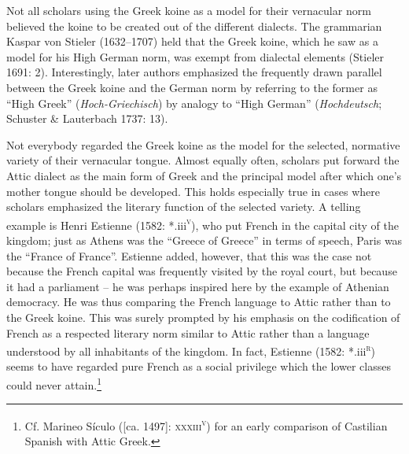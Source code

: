 \documentclass[12pt]{article}
\newenvironment{styleStandard}{\renewcommand\baselinestretch{1.25}\setlength\leftskip{0in}\setlength\rightskip{0in}\setlength\parindent{0.1972in}\setlength\parfillskip{0pt plus 1fil}\setlength\parskip{0in plus 1pt}\writerlistparindent\writerlistleftskip\leavevmode\normalfont\normalsize\writerlistlabel\ignorespaces}{\unskip\vspace{0in plus 1pt}\par}
\newcommand\writerlistleftskip{}
\newcommand\writerlistparindent{}
\newcommand\writerlistlabel{}
\begin{document}
\begin{styleStandard}
Not all scholars using the Greek koine as a model for their vernacular norm believed the koine to be created out of the different dialects. The grammarian Kaspar von Stieler (1632–1707) held that the Greek koine, which he saw as a model for his High German norm, was exempt from dialectal elements (Stieler 1691: 2). Interestingly, later authors emphasized the frequently drawn parallel between the Greek koine and the German norm by referring to the former as “High Greek” (\textit{Hoch-Griechisch}) by analogy to “High German” (\textit{Hochdeutsch}; Schuster \& Lauterbach 1737: 13).
\end{styleStandard}

\begin{styleStandard}
Not everybody regarded the Greek koine as the model for the selected, normative variety of their vernacular tongue. Almost equally often, scholars put forward the Attic dialect as the main form of Greek and the principal model after which one’s mother tongue should be developed. This holds especially true in cases where scholars emphasized the literary function of the selected variety. A telling example is Henri Estienne (1582: *.iii\textsc{\textsuperscript{v}}), who put French in the capital city of the kingdom; just as Athens was the “Greece of Greece” in terms of speech, Paris was the “France of France”. Estienne added, however, that this was the case not because the French capital was frequently visited by the royal court, but because it had a parliament – he was perhaps inspired here by the example of Athenian democracy. He was thus comparing the French language to Attic rather than to the Greek koine. This was surely prompted by his emphasis on the codification of French as a respected literary norm similar to Attic rather than a language understood by all inhabitants of the kingdom. In fact, Estienne (1582: *.iii\textsc{\textsuperscript{r}}) seems to have regarded pure French as a social privilege which the lower classes could never attain.\footnote{ Cf. Marineo Sículo ([ca. 1497]: \textsc{xxxiii}\textsc{\textsuperscript{v}}) for an early comparison of Castilian Spanish with Attic Greek.}
\end{styleStandard}
\end{document}
